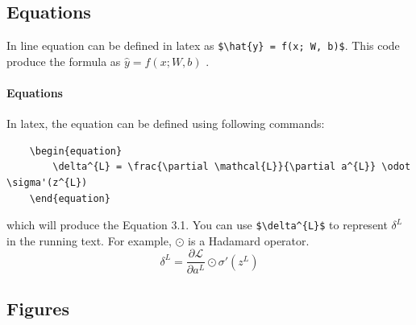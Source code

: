 \subsection{Equations}
\label{subsec:latex-equations}
In line equation can be defined in latex as \verb|$\hat{y} = f(x; W, b)$|. This code produce the formula as $\hat{y} = f(x; W, b)$ . 

\paragraph{Equations}
In latex, the equation can be defined using following commands: 
\begin{verbatim}
	\begin{equation}
		\delta^{L} = \frac{\partial \mathcal{L}}{\partial a^{L}} \odot \sigma'(z^{L})
	\end{equation}
\end{verbatim}
which will produce the Equation 3.1. You can use \verb|$\delta^{L}$| to represent $\delta^{L}$ in the running text.  For example, $\odot$ is a Hadamard operator. 
\begin{equation}
	\delta^{L} = \frac{\partial \mathcal{L}}{\partial a^{L}} \odot \sigma'(z^{L})
\end{equation}

\subsection{Figures}
\label{subsec:latex-figures}
